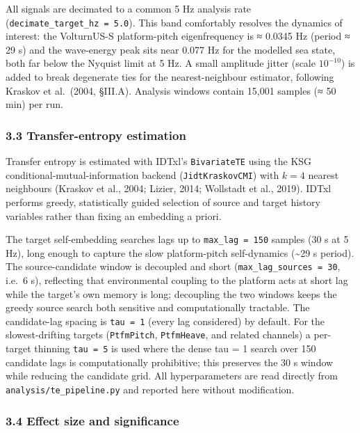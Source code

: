 \documentclass[
  english,
  11pt,
]{article}
\begin{document}
All signals are decimated to a common 5 Hz analysis rate
(\texttt{decimate\_target\_hz\ =\ 5.0}). This band comfortably resolves
the dynamics of interest: the VolturnUS-S platform-pitch eigenfrequency
is ≈ 0.0345 Hz (period ≈ 29 s) and the wave-energy peak sits near 0.077
Hz for the modelled sea state, both far below the Nyquist limit at 5 Hz.
A small amplitude jitter (scale \(10^{-10}\)) is added to break
degenerate ties for the nearest-neighbour estimator, following Kraskov
et al.~(2004, §III.A). Analysis windows contain 15,001 samples (≈ 50
min) per run.

\subsubsection{3.3 Transfer-entropy
estimation}\label{transfer-entropy-estimation}

Transfer entropy is estimated with IDTxl's \texttt{BivariateTE} using
the KSG conditional-mutual-information backend (\texttt{JidtKraskovCMI})
with \(k = 4\) nearest neighbours (Kraskov et al., 2004; Lizier, 2014;
Wollstadt et al., 2019). IDTxl performs greedy, statistically guided
selection of source and target history variables rather than fixing an
embedding a priori.

The target self-embedding searches lags up to \texttt{max\_lag\ =\ 150}
samples (30 s at 5 Hz), long enough to capture the slow platform-pitch
self-dynamics (\textasciitilde29 s period). The source-candidate window
is decoupled and short (\texttt{max\_lag\_sources\ =\ 30}, i.e.~6 s),
reflecting that environmental coupling to the platform acts at short lag
while the target's own memory is long; decoupling the two windows keeps
the greedy source search both sensitive and computationally tractable.
The candidate-lag spacing is \texttt{tau\ =\ 1} (every lag considered)
by default. For the slowest-drifting targets (\texttt{PtfmPitch},
\texttt{PtfmHeave}, and related channels) a per-target thinning
\texttt{tau\ =\ 5} is used where the dense tau = 1 search over 150
candidate lags is computationally prohibitive; this preserves the 30 s
window while reducing the candidate grid. All hyperparameters are read
directly from \texttt{analysis/te\_pipeline.py} and reported here
without modification.

\subsubsection{3.4 Effect size and
significance}\label{effect-size-and-significance}
\end{document}
